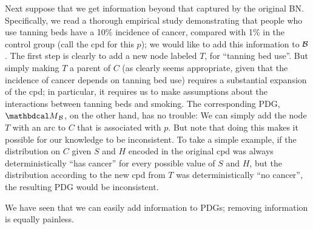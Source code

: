 \begin{example}[emulating a BN]
Next suppose that we get information beyond that captured by the original BN.
Specifically, we read a thorough empirical study demonstrating that people who
use tanning beds have a 10\% incidence of cancer, compared with 1\% in the
control group 
(call the cpd for this $p$); we would like to add this information to
$\cal B$. The first step is clearly to add a new node labeled $T$, for ``tanning
bed use''.  But simply making $T$ a parent of $C$ (as clearly seems appropriate,
given that the incidence of cancer depends on tanning bed use) requires a
substantial expansion of the cpd; in particular, it requires us to make
assumptions about the interactions between tanning beds and smoking.  
The corresponding PDG, $\PDGof{{\mathcal B}}$, on the other hand, has no
trouble: We can simply add the node $T$ with an arc to $C$ that is associated
with $p$.  But note that doing this makes it possible for our knowledge to
be inconsistent. To take a simple example, if the distribution on $C$ given $S$
and $H$ encoded in the original cpd was always deterministically ``has cancer''
for every possible value of $S$ and $H$, but the distribution according to the
new cpd from $T$ was deterministically ``no cancer'', the resulting PDG would be
inconsistent.  
\end{example}


We have seen that we can easily add information to PDGs; removing information is
equally painless.   

